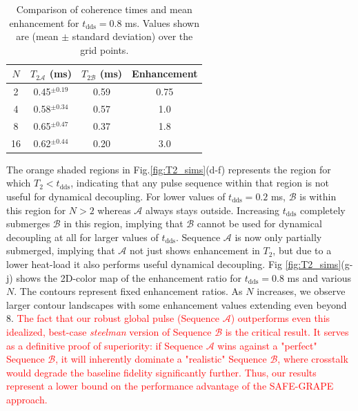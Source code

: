 \documentclass[%
 reprint,
 superscriptaddress,
 amsmath,amssymb,
 aps,
 prx,
]{revtex4-2}
\newcommand{\rev}[1]{\textcolor{red}{#1}}
\begin{document}
\begin{table}[h]
\centering
\caption{Comparison of coherence times and mean enhancement for $t_{\text{dds}}=0.8$ ms. Values shown are (mean $\pm$ standard deviation) over the grid points.
}
\begin{tabular}{|c| c| c |c|}
\hline
$N$ & $T_{2\mathcal{A}}$ (ms) & $T_{2\mathcal{B}}$ (ms) & Enhancement \\
\hline
\rule{0pt}{2.5ex}
2   & 0.45$^{\pm0.19}$  & 0.59  & 0.75 \\
\hline
\rule{0pt}{2.5ex}
4   & 0.58$^{\pm0.34}$  & 0.57  & 1.0 \\
\hline
\rule{0pt}{2.5ex}
8   & 0.65$^{\pm0.47}$  & 0.37  & 1.8 \\
\hline
\rule{0pt}{2.5ex}
16   & 0.62$^{\pm0.44}$  & 0.20  & 3.0 \\
\hline
\end{tabular}
\label{tab:t2_comparison2}
\end{table}
The orange shaded regions in Fig.\ref{fig:T2_sims}(d-f) represents the region for which $T_{2}<t_{\text{dds}}$, indicating that any pulse sequence within that region is not useful for dynamical decoupling. For lower values of $t_{\text{dds}}= 0.2$ ms, $\mathcal{B}$ is within this region for $N>2$ whereas $\mathcal{A}$ always stays outside. Increasing $t_{\text{dds}}$ completely submerges $\mathcal{B}$ in this region, implying that $\mathcal{B}$ cannot be used for dynamical decoupling at all for larger values of $t_{\text{dds}}$. Sequence $\mathcal{A}$ is now only partially submerged, implying that $\mathcal{A}$ not just shows enhancement in $T_{2}$, but due to a lower heat-load it also performs useful dynamical decoupling. Fig \ref{fig:T2_sims}(g-j) shows the 2D-color map of the enhancement ratio for $t_{\text{dds}}=0.8$ ms and various $N$. The contours represent fixed enhancement ratios. As $N$ increases, we observe larger contour landscapes with some enhancement values extending even beyond 8. 
\rev{The fact that our robust global pulse (Sequence $\mathcal{A}$) outperforms even this idealized, best-case \textit{steelman} version of Sequence $\mathcal{B}$ is the critical result. It serves as a definitive proof of superiority: if Sequence $\mathcal{A}$ wins against a "perfect" Sequence $\mathcal{B}$, it will inherently dominate a "realistic" Sequence $\mathcal{B}$, where crosstalk would degrade the baseline fidelity significantly further. Thus, our results represent a lower bound on the performance advantage of the SAFE-GRAPE approach.}
\end{document}
